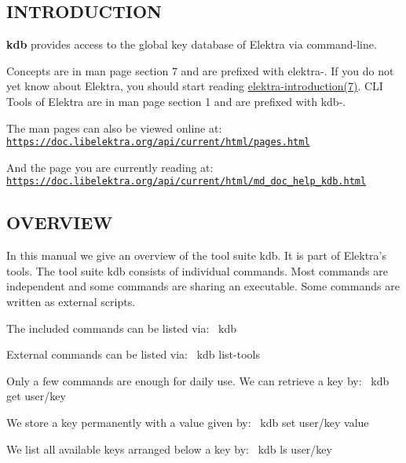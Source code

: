 \subsection*{I\+N\+T\+R\+O\+D\+U\+C\+T\+I\+ON}

{\bfseries kdb} provides access to the global key database of Elektra via command-\/line.

Concepts are in man page section 7 and are prefixed with {\ttfamily elektra-\/}. If you do not yet know about Elektra, you should start reading \hyperlink{doc_help_elektra-introduction_md}{elektra-\/introduction(7)}. C\+LI Tools of Elektra are in man page section 1 and are prefixed with {\ttfamily kdb-\/}.

The man pages can also be viewed online at\+: \href{https://doc.libelektra.org/api/current/html/pages.html}{\tt https\+://doc.\+libelektra.\+org/api/current/html/pages.\+html}

And the page you are currently reading at\+: \href{https://doc.libelektra.org/api/current/html/md_doc_help_kdb.html}{\tt https\+://doc.\+libelektra.\+org/api/current/html/md\+\_\+doc\+\_\+help\+\_\+kdb.\+html}

\subsection*{O\+V\+E\+R\+V\+I\+EW}

In this manual we give an overview of the tool suite {\ttfamily kdb}. It is part of Elektra’s tools. The tool suite {\ttfamily kdb} consists of individual commands. Most commands are independent and some commands are sharing an executable. Some commands are written as external scripts.

The included commands can be listed via\+:~\newline
 {\ttfamily kdb}

External commands can be listed via\+:~\newline
 {\ttfamily kdb list-\/tools}

Only a few commands are enough for daily use. We can retrieve a key by\+:~\newline
 {\ttfamily kdb get user/key}

We store a key permanently with a value given by\+:~\newline
 {\ttfamily kdb set user/key value}

We list all available keys arranged below a key by\+:~\newline
 {\ttfamily kdb ls user/key}

